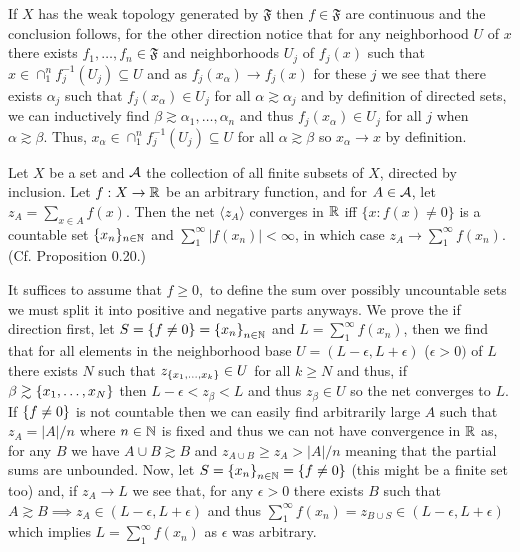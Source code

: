 \documentclass[12pt,a4paper]{article}
\begin{document}
\begin{solution}
    If $X$ has the weak topology generated by $\mathfrak F$ then $f\in\mathfrak F$ are continuous and the conclusion follows, for the other direction notice that for any neighborhood $U$ of $x$ there exists $f_1,\ldots,f_n\in\mathfrak F$ and neighborhoods $U_j$ of $f_j(x)$ such that $x\in\cap_1^nf_j^{-1}(U_j)\subseteq U$ and as $f_j(x_\alpha)\to f_j(x)$ for these $j$ we see that there exists $\alpha_j$ such that $f_j(x_\alpha)\in U_j$ for all $\alpha\gtrsim\alpha_j$ and by definition of directed sets, we can inductively find $\beta\gtrsim\alpha_1,\ldots,\alpha_n$ and thus $f_j(x_\alpha)\in U_j$ for all $j$ when $\alpha\gtrsim\beta.$ 
    Thus, $x_\alpha\in\cap_1^nf_j^{-1}(U_j) \subseteq U$ for all $\alpha\gtrsim\beta$ so $x_\alpha\to x$ by definition. 
\end{solution}
\begin{problem}\label{prob:4-35}
Let $X$ be a set and $\mathcal{A}$ the collection of all finite subsets of $X$, directed by inclusion. Let $f : X \to \mathbb{R}$ be an arbitrary function, and for $A \in \mathcal{A}$, let $z_A = \sum_{x \in A} f(x)$. Then the net $\langle z_A \rangle$ converges in $\mathbb{R}$ iff $\{x : f(x) \neq 0\}$ is a countable set $\{x_n\}_{n \in \mathbb{N}}$ and $\sum_{1}^\infty |f(x_n)| < \infty$, in which case $z_A \to \sum_{1}^\infty f(x_n)$. (Cf. Proposition 0.20.)
\end{problem}
\begin{solution}
    It suffices to assume that $f\geq 0,$ to define the sum over possibly uncountable sets we must split it into positive and negative parts anyways. 
    We prove the if direction first, let $S= \qty{f\neq 0}= \qty{x_n}_{n\in\mathbb{N}}$ and $L=\sum_1^\infty f(x_n)$, then we find that for all elements in the neighborhood base $U=(L-\epsilon,L+\epsilon)$ ($\epsilon>0)$ of $L$ there exists $N$ such that $z_ \qty{x_1,\ldots,x_k}\in U$ for all $k\geq N$ and thus, if $\beta\gtrsim \qty{x_1,\ldots,x_N}$ then $L-\epsilon<z_\beta<L$ and thus $z_\beta\in U$ so the net converges to $L.$ 
    If $ \qty{f\neq 0}$ is not countable then we can easily find arbitrarily large $A$ such that $z_A=|A|/n$ where $n\in\mathbb{N}$ is fixed and thus we can not have convergence in $\mathbb{R}$ as, for any $B$ we have $A\cup B\gtrsim B$ and $z_{A\cup B}\geq z_A>|A|/n$ meaning that the partial sums are unbounded.  
    Now, let $S=\qty{x_n}_{n\in\mathbb{N}}= \qty{f\neq 0}$ (this might be a finite set too) and, if $z_A\to L$ we see that, for any $\epsilon>0$ there exists $B$ such that $A\gtrsim B\implies z_A\in(L-\epsilon,L+\epsilon)$ and thus $\sum_1^\infty f(x_n)=z_{B\cup S}\in(L-\epsilon,L+\epsilon)$ which implies $L=\sum_1^\infty f(x_n)$ as $\epsilon$ was arbitrary. 
\end{solution}
\end{document}
